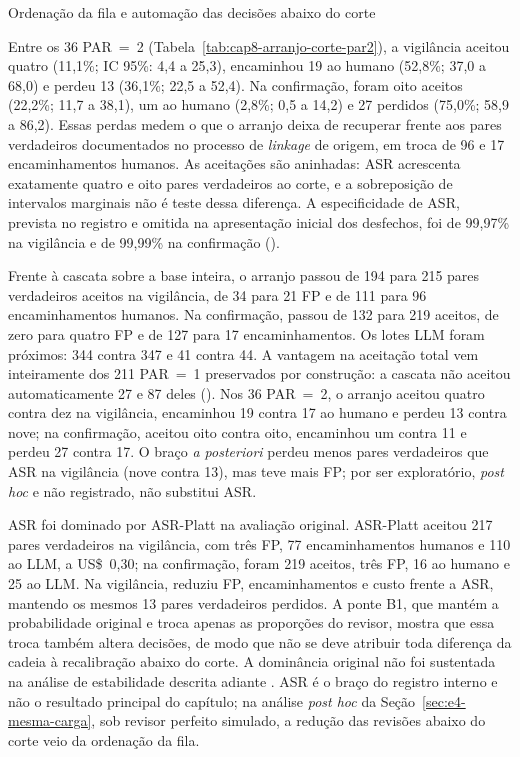\begin{chapter}{Ordenação da fila e automação das decisões abaixo do corte}


Entre os 36 PAR~=~2 (Tabela~\ref{tab:cap8-arranjo-corte-par2}), a vigilância aceitou quatro (11,1\%; IC 95\%: 4,4 a 25,3), encaminhou 19 ao humano (52,8\%; 37,0 a 68,0) e perdeu 13 (36,1\%; 22,5 a 52,4). Na confirmação, foram oito aceitos (22,2\%; 11,7 a 38,1), um ao humano (2,8\%; 0,5 a 14,2) e 27 perdidos (75,0\%; 58,9 a 86,2). Essas perdas medem o que o arranjo deixa de recuperar frente aos pares verdadeiros documentados no processo de \textit{linkage} de origem, em troca de 96 e 17 encaminhamentos humanos. As aceitações são aninhadas: ASR acrescenta exatamente quatro e oito pares verdadeiros ao corte, e a sobreposição de intervalos marginais não é teste dessa diferença. A especificidade de ASR, prevista no registro e omitida na apresentação inicial dos desfechos, foi de 99,97\% na vigilância e de 99,99\% na confirmação ().

Frente à cascata sobre a base inteira, o arranjo passou de 194 para 215 pares verdadeiros aceitos na vigilância, de 34 para 21 FP e de 111 para 96 encaminhamentos humanos. Na confirmação, passou de 132 para 219 aceitos, de zero para quatro FP e de 127 para 17 encaminhamentos. Os lotes LLM foram próximos: 344 contra 347 e 41 contra 44. A vantagem na aceitação total vem inteiramente dos 211 PAR~=~1 preservados por construção: a cascata não aceitou automaticamente 27 e 87 deles (). Nos 36 PAR~=~2, o arranjo aceitou quatro contra dez na vigilância, encaminhou 19 contra 17 ao humano e perdeu 13 contra nove; na confirmação, aceitou oito contra oito, encaminhou um contra 11 e perdeu 27 contra 17. O braço \textit{a posteriori} perdeu menos pares verdadeiros que ASR na vigilância (nove contra 13), mas teve mais FP; por ser exploratório, \textit{post hoc} e não registrado, não substitui ASR.

ASR foi dominado por ASR-Platt na avaliação original. ASR-Platt aceitou 217 pares verdadeiros na vigilância, com três FP, 77 encaminhamentos humanos e 110 ao LLM, a US\$~0,30; na confirmação, foram 219 aceitos, três FP, 16 ao humano e 25 ao LLM. Na vigilância, reduziu FP, encaminhamentos e custo frente a ASR, mantendo os mesmos 13 pares verdadeiros perdidos. A ponte B1, que mantém a probabilidade original e troca apenas as proporções do revisor, mostra que essa troca também altera decisões, de modo que não se deve atribuir toda diferença da cadeia à recalibração abaixo do corte. A dominância original não foi sustentada na análise de estabilidade descrita adiante \cite{Jardim2026phdrepo}. ASR é o braço do registro interno e não o resultado principal do capítulo; na análise \textit{post hoc} da Seção~\ref{sec:e4-mesma-carga}, sob revisor perfeito simulado, a redução das revisões abaixo do corte veio da ordenação da fila.


\end{chapter}

